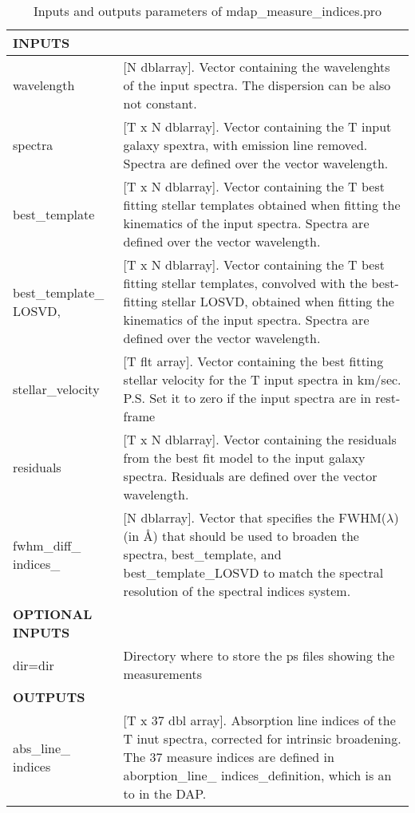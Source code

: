\documentclass[11pt]{book}
\begin{document}
\begin{center}
\begin{longtable}{p{2.7cm}| p{11.1cm}}
\caption{Inputs and outputs parameters of mdap\_measure\_indices.pro} \label{dap_tab:mdap_measure_indices} \\
\hline
\endfirsthead
\hline
\endhead
\hline
\endlastfoot
\hline
{\bf  INPUTS} & \\
\hline
wavelength & [N dblarray]. Vector containing the wavelenghts of the input spectra. The dispersion can be also not constant.\\
%
spectra & [T x N dblarray].  Vector containing the T input galaxy spextra, with emission line removed. Spectra are defined over the vector wavelength.\\
%
best\_template & [T x N dblarray]. Vector containing the T best fitting stellar templates obtained when fitting the kinematics of the input spectra. 
                Spectra are defined over the vector wavelength.\\
%
best\_template\_ LOSVD, & [T x N dblarray]. Vector containing the T best fitting stellar templates, convolved with the best-fitting stellar LOSVD, obtained when 
                  fitting the kinematics of the input spectra. Spectra are defined over the vector wavelength. \\
%
stellar\_velocity & [T flt array]. Vector containing the best fitting stellar velocity for the T input spectra in km/sec. P.S. Set it to zero if the input spectra are in rest-frame\\
%
residuals & [T x N dblarray]. Vector containing the residuals from the best fit model to the input galaxy spectra. Residuals are defined over the vector wavelength.  \\
%
fwhm\_diff\_ indices\_ & [N dblarray]. Vector that specifies the FWHM($\lambda$) (in \AA) that should be used to broaden the spectra, best\_template, and best\_template\_LOSVD to match the spectral resolution of the spectral indices system.\\
\hline 
{\bf OPTIONAL INPUTS} & \\
dir=dir  &  Directory where to store the ps files showing the measurements \\
%
\hline
{\bf OUTPUTS} & \\
abs\_line\_ indices & [T x 37 dbl array]. Absorption line indices of the T inut spectra, corrected for intrinsic broadening. The 37 measure indices are defined in 
   aborption\_line\_ indices\_definition, which is an to in the DAP.\\

\end{longtable}
\end{center}
\end{document}
